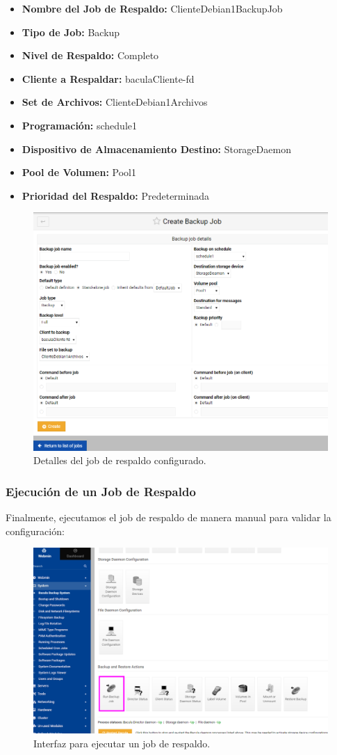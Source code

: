 \begin{itemize}
    \item \textbf{Nombre del Job de Respaldo:} ClienteDebian1BackupJob
    \item \textbf{Tipo de Job:} Backup
    \item \textbf{Nivel de Respaldo:} Completo
    \item \textbf{Cliente a Respaldar:} baculaCliente-fd
    \item \textbf{Set de Archivos:} ClienteDebian1Archivos
    \item \textbf{Programación:} schedule1
    \item \textbf{Dispositivo de Almacenamiento Destino:} StorageDaemon
    \item \textbf{Pool de Volumen:} Pool1
    \item \textbf{Prioridad del Respaldo:} Predeterminada
\end{itemize}

\begin{figure}[H]
    \centering
    \includegraphics[width=0.5\linewidth]{instalacionBacula/Backupjobdetails.png}
    \caption{Detalles del job de respaldo configurado.}
\end{figure}

\subsubsection{Ejecución de un Job de Respaldo}

Finalmente, ejecutamos el job de respaldo de manera manual para validar la configuración:

\begin{figure}[H]
    \centering
    \includegraphics[width=0.5\linewidth]{instalacionBacula/runbackupjonbb.png}
    \caption{Interfaz para ejecutar un job de respaldo.}
\end{figure}

